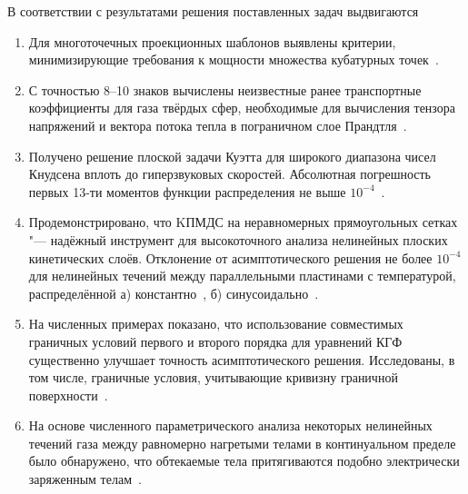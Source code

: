 В соответствии с результатами решения поставленных задач выдвигаются {}
\begin{enumerate}
    \item\label{defpos:stencils}
    Для многоточечных проекционных шаблонов выявлены критерии,
    минимизирующие требования к мощности множества кубатурных точек~\cite{Rogozin2016}.
    \item\label{defpos:transport_coeffs}
    С точностью 8--10 знаков вычислены неизвестные ранее транспортные коэффициенты для газа твёрдых сфер,
    необходимые для вычисления тензора напряжений и вектора потока тепла в пограничном слое Прандтля~\cite{Rogozin2016}.
    \item\label{defpos:Couette_flow}
    Получено решение плоской задачи Куэтта для широкого диапазона чисел Кнудсена вплоть до гиперзвуковых скоростей.
    Абсолютная погрешность первых 13-ти моментов функции распределения не выше \(10^{-4}\)~\cite{Rogozin2016}.
    \item\label{defpos:asymptotic_verification}
    Продемонстрировано, что KПМДС на неравномерных прямоугольных сетках "--- надёжный инструмент
    для высокоточного анализа нелинейных плоских кинетических слоёв. Отклонение от асимптотического
    решения не более \(10^{-4}\) для нелинейных течений между параллельными пластинами с температурой,
    распределённой а) константно~\cite{Rogozin2016}, б) синусоидально~\cite{Rogozin2017}.
    \item\label{defpos:boundary_conditions}
    На численных примерах показано, что использование совместимых граничных условий первого и второго порядка
    для уравнений КГФ существенно улучшает точность асимптотического решения.
    Исследованы, в том числе, граничные условия, учитывающие кривизну граничной поверхности~\cite{Rogozin2017}.
    \item\label{defpos:snit_forces}
    На основе численного параметрического анализа некоторых нелинейных течений газа
    между равномерно нагретыми телами в континуальном пределе было обнаружено,
    что обтекаемые тела притягиваются подобно электрически заряженным телам~\cite{Rogozin2014}.
\end{enumerate}

